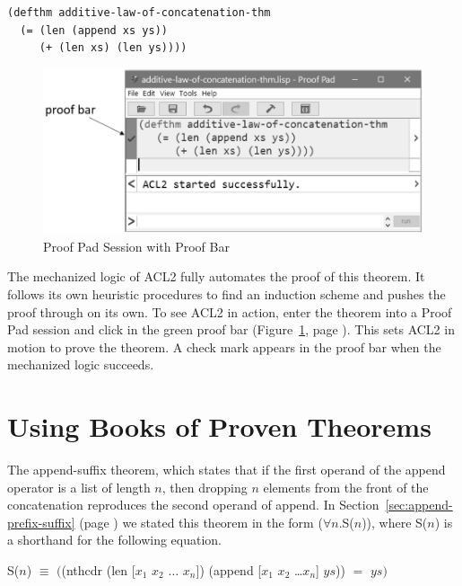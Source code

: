 \begin{Verbatim}
(defthm additive-law-of-concatenation-thm
  (= (len (append xs ys))
     (+ (len xs) (len ys))))
\end{Verbatim}

\begin{figure}
\begin{center}
\includegraphics[scale=0.55]{images/additive-law-of-concatenation-thm-acl2-prf-bw.png}
\end{center}
\caption{Proof Pad Session with Proof Bar}
\label{fig:proof-bar-with-chk}
\end{figure}

The mechanized logic of ACL2 fully automates the proof of this theorem.
It follows its own heuristic procedures to find an induction scheme
and pushes the proof through on its own.
To see ACL2 in action, enter the theorem into a Proof Pad session
and click in the green proof bar
(Figure~\ref{fig:proof-bar-with-chk}, page \pageref{fig:proof-bar-with-chk}).
This sets ACL2 in motion to prove the theorem.
A check mark appears in the proof bar
when the mechanized logic succeeds.

\section{Using Books of Proven Theorems}
\label{sec:using-books-of-proven-theorems}

The append-suffix theorem, which states that
if the first operand of the append operator is a list of length $n$,
then dropping $n$ elements from the front of the concatenation
reproduces the second operand of \textsf{append}.
In Section~\ref{sec:append-prefix-suffix} (page \pageref{append-suffix-thm-pencil-proof})
we stated this theorem in the form ($\forall$$n$.S($n$)),
where S($n$) is a shorthand for the following equation.

\begin{samepage}
\begin{center}
S($n$) $\equiv$ $($\textsf{(nthcdr (len [$x_1$ $x_2$ $\dots$ $x_n$]) (append [$x_1$ $x_2$ \dots $x_n$] $ys$))}
$=$ $ys)$
\end{center}
\end{samepage}


